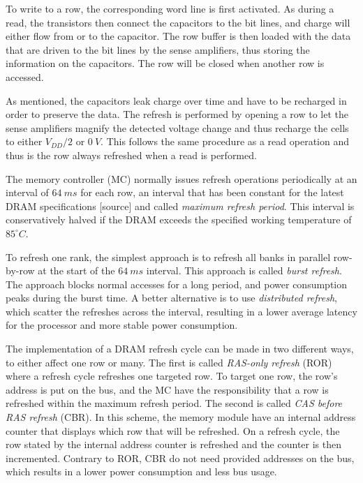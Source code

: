 To write to a row, the corresponding word line is first activated. As during a read, the transistors then connect the capacitors to the bit lines, and charge will either flow from or to the capacitor. The row buffer is then loaded with the data that are driven to the bit lines by the sense amplifiers, thus storing the information on the capacitors. The row will be closed when another row is accessed.

As mentioned, the capacitors leak charge over time and have to be recharged in order to preserve the data. The refresh is performed by opening a row to let the sense amplifiers magnify the detected voltage change and thus recharge the cells to either $V_{DD}/2$ or $0\:V$. This follows the same procedure as a read operation and thus is the row always refreshed when a read is performed. %

The memory controller (MC) normally issues refresh operations periodically at an interval of $64\:ms$ for each row, an interval that has been constant for the latest DRAM specifications [source] and called \textit{maximum refresh period}. This interval is conservatively halved if the DRAM exceeds the specified working temperature of $85^{\circ}C$. 

To refresh one rank, the simplest approach is to refresh all banks in parallel row-by-row at the start of the $64\:ms$ interval. This approach is called \textit{burst refresh}. The approach blocks normal accesses for a long period, and power consumption peaks during the burst time. A better alternative is to use \textit{distributed refresh}, which scatter the refreshes across the interval, resulting in a lower average latency for the processor and more stable power consumption.

The implementation of a DRAM refresh cycle can be made in two different ways, to either affect one row or many. The first is called \textit{RAS-only refresh} (ROR) where a refresh cycle refreshes one targeted row. To target one row, the row's address is put on the bus, and the MC have the responsibility that a row is refreshed within the maximum refresh period. The second is called \textit{CAS before RAS refresh} (CBR). In this scheme, the memory module have an internal address counter that displays which row that will be refreshed. On a refresh cycle, the row stated by the internal address counter is refreshed and the counter is then incremented. Contrary to ROR, CBR do not need provided addresses on the bus, which results in a lower power consumption and less bus usage. %


